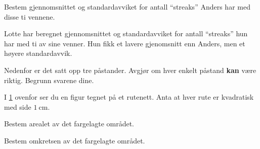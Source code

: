 \begin{oppgaver}
   Bestem gjennomsnittet og standardavviket for antall
    \enquote{streaks} Anders har med disse ti vennene.
\end{oppgaver}

Lotte har beregnet gjennomsnittet og standardavviket for antall
\enquote{streaks} hun har med ti av sine venner. Hun fikk et lavere gjenomsnitt
enn Anders, men et høyere standardavvik.

\begin{oppgaver}
   Nedenfor er det satt opp tre påstander. Avgjør om hver enkelt
    påstand \textbf{kan} være riktig. Begrunn svarene dine.
\end{oppgaver}

\clearpage
\Oppgave[4]

\begin{figure}[htpb]
  \centering
  \begin{adjustbox}{width=\textwidth}
  \end{adjustbox}
  \caption{}
  \label{fig:Forkurs-1p-2p-laererutdanning-2018-V-oppgave-2-5}
\end{figure}

I \cref{fig:Forkurs-1p-2p-laererutdanning-2018-V-oppgave-2-5} ovenfor ser du en
figur tegnet på et rutenett. Anta at hver rute er kvadratisk med side
$\SI{1}{\cm}$.

\begin{oppgaver}
   Bestem arealet av det fargelagte området.
\end{oppgaver}

\begin{oppgaver}
   Bestem omkretsen av det fargelagte området.
\end{oppgaver}


\Oppgave[6]

